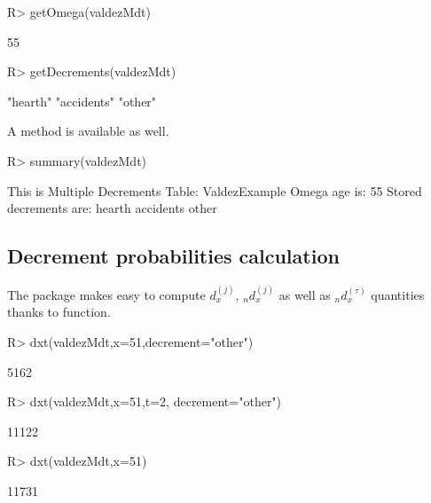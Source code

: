 \documentclass[nojss]{jss}
\begin{document}
\begin{Schunk}
\begin{Sinput}
R> getOmega(valdezMdt)
\end{Sinput}
\begin{Soutput}
[1] 55
\end{Soutput}
\begin{Sinput}
R> getDecrements(valdezMdt)
\end{Sinput}
\begin{Soutput}
[1] "hearth"    "accidents" "other"    
\end{Soutput}
\end{Schunk}

A  method is available as well.

\begin{Schunk}
\begin{Sinput}
R> summary(valdezMdt)
\end{Sinput}
\begin{Soutput}
This is Multiple Decrements Table:  ValdezExample 
 Omega age is:  55 
 Stored decrements are:  hearth accidents other
\end{Soutput}
\end{Schunk}

\subsection{Decrement probabilities calculation}


The  package makes easy to compute $d_{x}^{(j)}$,
${}_{n}d_{x}^{(j)}$ as well as ${}_{n}d_{x}^{(\tau)}$ quantities thanks to
 function.

\begin{Schunk}
\begin{Sinput}
R> dxt(valdezMdt,x=51,decrement="other")
\end{Sinput}
\begin{Soutput}
[1] 5162
\end{Soutput}
\begin{Sinput}
R> dxt(valdezMdt,x=51,t=2, decrement="other")
\end{Sinput}
\begin{Soutput}
[1] 11122
\end{Soutput}
\begin{Sinput}
R> dxt(valdezMdt,x=51)
\end{Sinput}
\begin{Soutput}
[1] 11731
\end{Soutput}
\end{Schunk}
\end{document}
